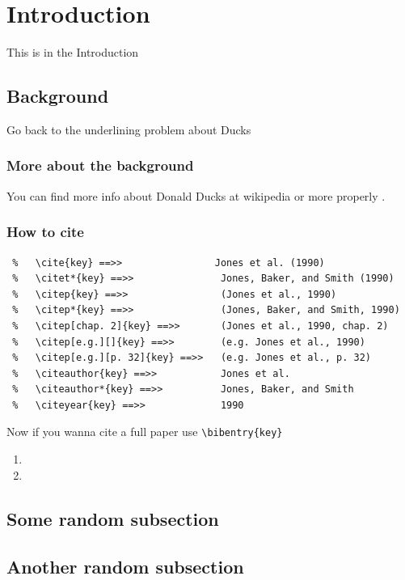 \section{Introduction}
This is in the Introduction
\subsection{Background}
Go back to the underlining problem about Ducks
\subsubsection{More about the background}
You can find more info about Donald Ducks at wikipedia \citep{swasey2015silver,xiang2014using} or more properly  \citep[p. 2]{swasey2015silver}.


\subsubsection{How to cite}

\begin{verbatim}
 %   \cite{key} ==>>                Jones et al. (1990)
 %   \citet*{key} ==>>               Jones, Baker, and Smith (1990)
 %   \citep{key} ==>>                (Jones et al., 1990)
 %   \citep*{key} ==>>               (Jones, Baker, and Smith, 1990)
 %   \citep[chap. 2]{key} ==>>       (Jones et al., 1990, chap. 2)
 %   \citep[e.g.][]{key} ==>>        (e.g. Jones et al., 1990)
 %   \citep[e.g.][p. 32]{key} ==>>   (e.g. Jones et al., p. 32)
 %   \citeauthor{key} ==>>           Jones et al.
 %   \citeauthor*{key} ==>>          Jones, Baker, and Smith
 %   \citeyear{key} ==>>             1990
\end{verbatim}


Now if you wanna cite a full paper use \verb!\bibentry{key}!

\begin{enumerate}
\item {}
\item {}
\end{enumerate}




\subsection{Some random subsection}
\kant[1]
\kant[2]

\subsection{Another random subsection}
\kant[2]

